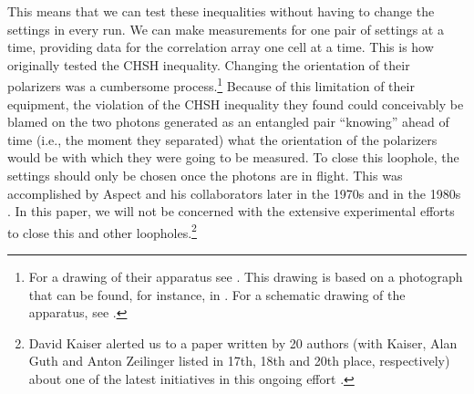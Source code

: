 This means that we can test these inequalities without having to change the settings in every run. We can make measurements for one pair of settings at a time, providing data for the correlation array one cell at a time. This is how \citet{Clauser and Freedman 1972} originally tested the CHSH inequality. Changing the orientation of their polarizers was a cumbersome process.\footnote{For a drawing of their apparatus see \citet[p.\ 262]{Gilder 2008}. This drawing is based on a photograph that can be found, for instance, in \citet[p.\ 48]{Kaiser 2011}. For a schematic drawing of the apparatus, see  \citet[p.\ 939, Figure 1]{Clauser and Freedman 1972}.} Because of this limitation of their equipment, the violation of the CHSH inequality they found could conceivably be blamed on the two photons generated as an entangled pair ``knowing'' ahead of time (i.e., the moment they separated) what the orientation of the polarizers would be with which they were going to be measured. To close this loophole, the settings should only be chosen once the photons are in flight. This was accomplished by Aspect and his collaborators later in the 1970s and in the 1980s \citep[Ch.\ 31]{Gilder 2008}. In this paper, we will not be concerned with the extensive experimental efforts to close this and other loopholes.\footnote{David Kaiser alerted us to a paper written by 20 authors (with Kaiser, Alan Guth and Anton Zeilinger listed in 17th, 18th and 20th place, respectively) about one of the latest initiatives in this ongoing effort \citep{Handsteiner 2017}.} 

